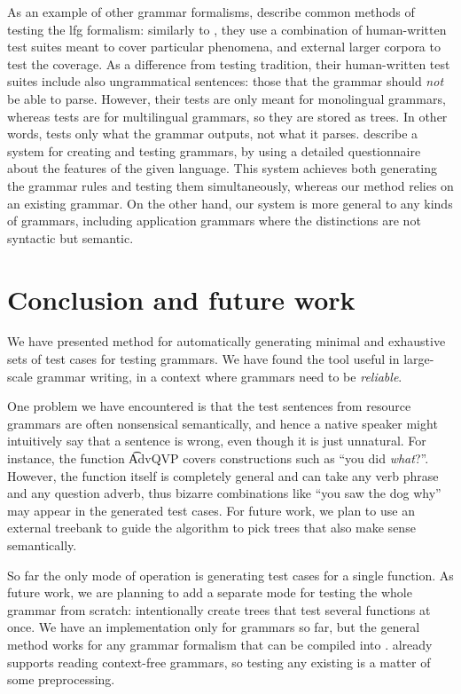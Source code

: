 As an example of other grammar formalisms,
\cite[pp.~212--213]{butt1999lfg} describe common methods of testing
the {\sc lfg} formalism: similarly to \gf, they use a combination of
human-written test suites meant to cover particular phenomena, and
external larger corpora to test the coverage. As a difference from \gf{}
testing tradition, their human-written test suites include also
ungrammatical sentences: those that the grammar should \emph{not} be
able to parse. However, their tests are only meant for monolingual
grammars, whereas \gf{} tests are for multilingual grammars, so they are
stored as trees. In other words, \gf{} tests only what the grammar
outputs, not what it parses.
\cite{bender2010} describe a system for creating and testing \hpsg{} \cite{pollard1994hpsg}
grammars, by using a detailed questionnaire about the features of the
given language. This system achieves both generating the grammar rules
and testing them simultaneously, whereas our method relies on an
existing grammar. On the other hand, our system is more general to any
kinds of grammars, including application grammars where the
distinctions are not syntactic but semantic.




\section{Conclusion and future work}

We have presented method for automatically generating minimal and exhaustive sets of test cases for testing grammars.  We have found the tool useful in large-scale grammar writing, in a context where grammars need to be \emph{reliable}.

One problem
we have encountered is that the test sentences from resource grammars are often
nonsensical semantically, and hence a native speaker might intuitively
say that a sentence is wrong, even though it is just unnatural. 
For instance, the function \t{AdvQVP} covers constructions such as ``you
did \emph{what}?''. However, the function itself is completely general
and can take any verb phrase and any question adverb, thus  bizarre
combinations like ``you saw the dog why'' may appear in the generated
test cases. For future work, we plan to use an external treebank to guide the algorithm to pick trees that also make sense semantically.

So far the only mode of operation is generating test cases for a
single function. 
As future work, we are planning to add a separate
mode for testing the whole grammar from scratch: intentionally create
trees that test several functions at once.
We have an implementation only for \gf{} grammars so far, but the
general method works for any grammar formalism that can be compiled
into \pmcfg{}. \gf{} already supports reading context-free grammars,
so testing any existing \cfg{} is a matter of some preprocessing. 
